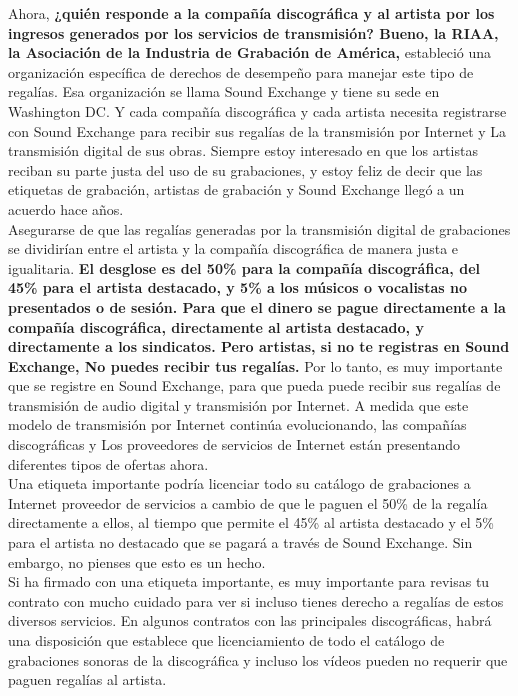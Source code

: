 \documentclass[10pt]{book}
\begin{document}
Ahora, \textbf{¿quién responde a la compañía discográfica y al artista por los ingresos generados por los servicios de transmisión? Bueno, la RIAA, la Asociación de la Industria de Grabación de América,} estableció una organización específica de derechos de desempeño para manejar este tipo de regalías. Esa organización se llama Sound Exchange y tiene su sede en Washington DC. Y cada compañía discográfica y cada artista necesita registrarse con Sound Exchange para recibir sus regalías de la transmisión por Internet y La transmisión digital de sus obras. Siempre estoy interesado en que los artistas reciban su parte justa del uso de su grabaciones, y estoy feliz de decir que las etiquetas de grabación, artistas de grabación y Sound Exchange llegó a un acuerdo hace años.\\
Asegurarse de que las regalías generadas por la transmisión digital de grabaciones se dividirían entre el artista y la compañía discográfica de manera justa e igualitaria.\textbf{ El desglose es del 50\% para la compañía discográfica, del 45\% para el artista destacado, y 5\% a los músicos o vocalistas no presentados o de sesión. Para que el dinero se pague directamente a la compañía discográfica, directamente al artista destacado, y directamente a los sindicatos. Pero artistas, si no te registras en Sound Exchange, No puedes recibir tus regalías.} Por lo tanto, es muy importante que se registre en Sound Exchange, para que pueda puede recibir sus regalías de transmisión de audio digital y transmisión por Internet. A medida que este modelo de transmisión por Internet continúa evolucionando, las compañías discográficas y Los proveedores de servicios de Internet están presentando diferentes tipos de ofertas ahora.\\
Una etiqueta importante podría licenciar todo su catálogo de grabaciones a Internet proveedor de servicios a cambio de que le paguen el 50\% de la regalía directamente a ellos, al tiempo que permite el 45\% al artista destacado y el 5\% para el artista no destacado que se pagará a través de Sound Exchange. Sin embargo, no pienses que esto es un hecho.\\
Si ha firmado con una etiqueta importante, es muy importante para revisas tu contrato con mucho cuidado para ver si incluso tienes derecho a regalías de estos diversos servicios. En algunos contratos con las principales discográficas, habrá una disposición que establece que licenciamiento de todo el catálogo de grabaciones sonoras de la discográfica y incluso los vídeos pueden no requerir que paguen regalías al artista.\\
\end{document}

